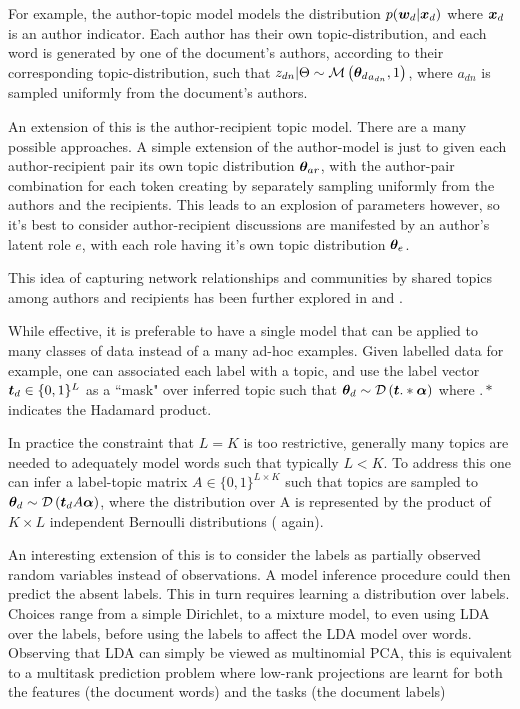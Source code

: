 For example, the author-topic model\cite{RosenZvi2004} models the distribution $p({ \bm w_d } | { \bm x_d })$ where ${ \bm x_d }$ is an author indicator. Each author has their own topic-distribution, and each word is generated by one of the document's authors, according to their corresponding topic-distribution, such that $z_{dn} | \Theta \sim \mathcal{M} \left( {{ \bm \theta_d }_{a_{dn}}},{1} \right)$, where $a_{dn}$ is sampled uniformly from the document's authors.

An extension of this is the author-recipient topic model\cite{MacCallum2007}. There are a many possible approaches. A simple extension of the author-model is just to given each author-recipient pair its own topic distribution $\bm \theta_{ar}$, with the author-pair combination for each token creating by separately sampling uniformly from the authors and the recipients. This leads to an explosion of parameters however, so it's best to consider author-recipient discussions are manifested by an author's latent role $e$, with each role having it's own topic distribution $\bm \theta_e$.

This idea of capturing network relationships and communities by shared topics among authors and recipients has been further explored in \cite{Sachan2012} and \cite{Kang2013}.

While effective, it is preferable to have a single model that can be applied to many classes of data instead of a many ad-hoc examples. Given labelled data for example, one can associated each label with a topic, and use the label vector $\bm t_d \in \{0,1\}^L$ as a ``mask" over inferred topic such that ${ \bm \theta_d } \sim \mathcal{D} \left( {\bm t .* \bm \alpha} \right)$\cite{Ramage2009} where $.*$ indicates the Hadamard product.

In practice the constraint that $L = K$ is too restrictive, generally many topics are needed to adequately model words such that typically $L < K$. To address this one can infer a label-topic matrix $A \in \{0,1\}^{L \times K}$ such that topics are sampled to ${ \bm \theta_d } \sim \mathcal{D} \left( {\bm t_d A \bm \alpha} \right)$, where the distribution over A is represented by the product of $K \times L$ independent Bernoulli distributions (\cite{Ramage2009} again).

An interesting extension of this is to consider the labels as partially observed random variables instead of observations. A model inference procedure could then predict the absent labels. This in turn requires learning a distribution over labels. Choices range from a simple Dirichlet, to a mixture model, to even using LDA over the labels, before using the labels to affect the LDA model over words\cite{Rubin2011}. Observing that LDA can simply be viewed as multinomial PCA, this is equivalent to a multitask prediction problem where low-rank projections are learnt for both the features (the document words) and the tasks (the document labels)


